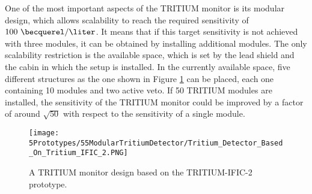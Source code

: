 One of the most important aspects of the TRITIUM monitor is its modular design, which allows scalability to reach the required sensitivity of $100~\becquerel/\liter$. It means that if this target sensitivity is not achieved with three modules, it can be obtained by installing additional modules. The only scalability restriction is the available space, which is set by the lead shield and the cabin in which the setup is installed. In the currently available space, five different structures as the one shown in Figure \ref{fig:TritiumMonitorIFIC2Design} can be placed, each one containing 10 modules and two active veto. If 50 TRITIUM modules are installed, the sensitivity of the TRITIUM monitor could be improved by a factor of around $\sqrt{50}$ with respect to the sensitivity of a single module.

\begin{figure}[h]
\centering
\texttt{[image: 5Prototypes/55ModularTritiumDetector/Tritium\_Detector\_Based\_On\_Tritium\_IFIC\_2.PNG]}
\caption{A TRITIUM monitor design based on the TRITIUM-IFIC-2 prototype.\label{fig:TritiumMonitorIFIC2Design}}
\end{figure}